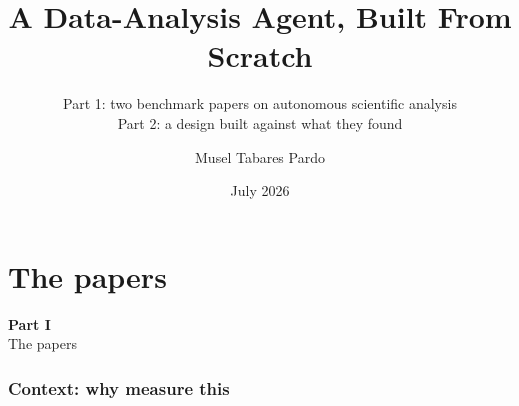 \documentclass[9pt,aspectratio=169]{beamer}
\title[A Data-Analysis Agent]{A Data-Analysis Agent, Built From Scratch}
\subtitle{Part 1: two benchmark papers on autonomous scientific analysis\\
          Part 2: a design built against what they found}
\author[M. Tabares Pardo]{Musel Tabares Pardo}
\institute[]{}
\date[July 2026]{July 2026}
\begin{document}
\begin{frame}[plain]
\maketitle
\end{frame}

\newcommand{\outlineframe}{%
\begin{frame}{Outline}
\setbeamertemplate{section in toc}[sections numbered]
{\small
\begin{columns}[T]
\begin{column}{0.49\textwidth}
  {\usebeamercolor[fg]{structure}\textbf{Part I --- The papers}}\par\smallskip
  \tableofcontents[part=1, currentsection, hideallsubsections]
\end{column}
\begin{column}{0.49\textwidth}
  {\usebeamercolor[fg]{structure}\textbf{Part II --- The design}}\par\smallskip
  \tableofcontents[part=2, currentsection, hideallsubsections]
\end{column}
\end{columns}}
\end{frame}}

\part{The papers}
\begin{frame}[plain]
\centering\vfill
{\Huge\textbf{Part I}}\\[10pt]
{\Large The papers}
\vfill
\end{frame}

\section{Context: why measure this}
\end{document}
